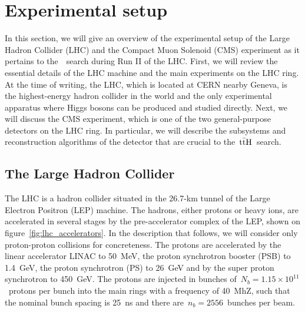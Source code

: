 \chapter{Experimental setup}
In this section, we will give an overview of the experimental setup of the Large Hadron Collider (LHC) and the Compact Muon Solenoid (CMS) experiment as it pertains to the~\ttH~search during Run II of the LHC. First, we will review the essential details of the LHC machine and the main experiments on the LHC ring. At the time of writing, the LHC, which is located at CERN nearby Geneva, is the highest-energy hadron collider in the world and the only experimental apparatus where Higgs bosons can be produced and studied directly. Next, we will discuss the CMS experiment, which is one of the two general-purpose detectors on the LHC ring. In particular, we will describe the subsystems and reconstruction algorithms of the detector that are crucial to the~$\mathrm{t} \bar{\mathrm{t}} \mathrm{H}$~search.

\section{The Large Hadron Collider}
The LHC is a hadron collider situated in the 26.7-km tunnel of the Large Electron Positron (LEP) machine. The hadrons, either protons or heavy ions, are accelerated in several stages by the pre-accelerator complex of the LEP, shown on figure~\cref{fig:lhc_accelerators}. In the description that follows, we will consider only proton-proton collisions for concreteness. The protons are accelerated by the linear accelerator LINAC to 50~MeV, the proton synchrotron booster (PSB) to 1.4~GeV, the proton synchrotron (PS) to 26~GeV and by the super proton synchrotron to 450~GeV. The protons are injected in bunches of~$N_b = 1.15 \times 10^{11}$~protons per bunch into the main rings with a frequency of 40~MhZ, such that the nominal bunch spacing is 25~ns and there are~$n_b=2556$~bunches per beam.

